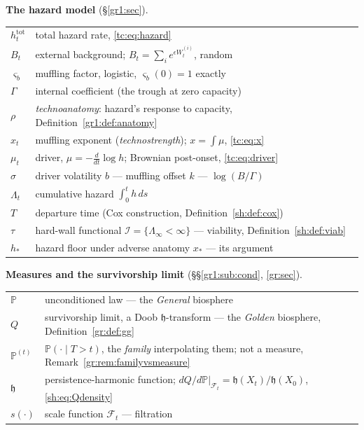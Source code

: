 \documentclass[11pt]{article}
\numberwithin{equation}{section}
\theoremstyle{plain}
\theoremstyle{definition}
\theoremstyle{remark}
\newcommand{\PP}{\mathbb{P}}
\newcommand{\Imm}{\mathcal{I}}
\newcommand{\Fc}{\mathcal{F}}
\newcommand{\hm}{\mathfrak{h}}
\begin{document}
\smallskip
\noindent\textbf{The hazard model} (\S\ref{gr1:sec}).
\begin{center}\small
\begin{tabular}{@{}ll@{}}
\toprule
$h^{\mathrm{tot}}_t$ & total hazard rate, \eqref{tc:eq:hazard}\\
$B_t$ & external background; $B_t=\sum_i e^{\epsilon W^{(i)}_t}$, random\\
$\varsigma_b$ & muffling factor, logistic, $\varsigma_b(0)=1$ exactly\\
$\Gamma$ & internal coefficient (the trough at zero capacity)\\
$\rho$ & \emph{technoanatomy}: hazard's response to capacity,
Definition~\ref{gr1:def:anatomy}\\
$x_t$ & muffling exponent (\emph{technostrength}); $x=\int\mu$,
\eqref{tc:eq:x}\\
$\mu_t$ & driver, $\mu=-\tfrac{d}{dt}\log h$; Brownian post-onset,
\eqref{tc:eq:driver}\\
$\sigma$ & driver volatility \qquad $b$ --- muffling offset \qquad
$k$ --- $\log(B/\Gamma)$\\
$\Lambda_t$ & cumulative hazard $\int_0^t h\,ds$\\
$T$ & departure time (Cox construction, Definition~\ref{sh:def:cox})\\
$\tau$ & hard-wall functional \qquad $\Imm=\{\Lambda_\infty<\infty\}$ ---
viability, Definition~\ref{sh:def:viab}\\
$h_\ast$ & hazard floor under adverse anatomy \qquad $x_\ast$ --- its
argument\\
\bottomrule
\end{tabular}
\end{center}

\smallskip
\noindent\textbf{Measures and the survivorship limit}
(\S\S\ref{gr1:sub:cond}, \ref{gr:sec}).
\begin{center}\small
\begin{tabular}{@{}ll@{}}
\toprule
$\PP$ & unconditioned law --- the \emph{General} biosphere\\
$Q$ & survivorship limit, a Doob $\hm$-transform --- the \emph{Golden}
biosphere, Definition~\ref{gr:def:gg}\\
$\PP^{(t)}$ & $\PP(\cdot\mid T>t)$, the \emph{family} interpolating them;
not a measure, Remark~\ref{gr:rem:familyvsmeasure}\\
$\hm$ & persistence-harmonic function; $dQ/d\PP|_{\Fc_t}=\hm(X_t)/\hm(X_0)$,
\eqref{sh:eq:Qdensity}\\
$s(\cdot)$ & scale function \qquad $\Fc_t$ --- filtration\\
\bottomrule
\end{tabular}
\end{center}
\end{document}
